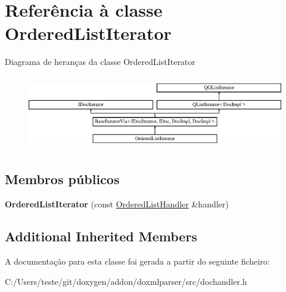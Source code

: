 \hypertarget{class_ordered_list_iterator}{\section{Referência à classe Ordered\-List\-Iterator}
\label{class_ordered_list_iterator}
}
Diagrama de heranças da classe Ordered\-List\-Iterator\begin{figure}[H]
\begin{center}
\leavevmode
\includegraphics[height=3.294118cm]{class_ordered_list_iterator}
\end{center}
\end{figure}
\subsection*{Membros públicos}
\begin{DoxyCompactItemize}
\item 
\hypertarget{class_ordered_list_iterator_af4a71aeccab24a1af122ac3aa8a5c8e4}{{\bfseries Ordered\-List\-Iterator} (const \hyperlink{class_ordered_list_handler}{Ordered\-List\-Handler} \&handler)}\label{class_ordered_list_iterator_af4a71aeccab24a1af122ac3aa8a5c8e4}

\end{DoxyCompactItemize}
\subsection*{Additional Inherited Members}


A documentação para esta classe foi gerada a partir do seguinte ficheiro\-:\begin{DoxyCompactItemize}
\item 
C\-:/\-Users/teste/git/doxygen/addon/doxmlparser/src/dochandler.\-h\end{DoxyCompactItemize}
